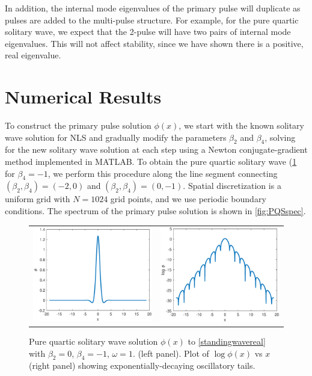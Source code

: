 \documentclass[12pt]{article}
\begin{document}
In addition, the internal mode eigenvalues of the primary pulse will duplicate as pulses are added to the multi-pulse structure. For example, for the pure quartic solitary wave, we expect that the 2-pulse will have two pairs of internal mode eigenvalues. This will not affect stability, since we have shown there is a positive, real eigenvalue.

\section{Numerical Results}

To construct the primary pulse solution $\phi(x)$, we start with the known solitary wave solution for NLS and gradually modify the parameters $\beta_2$ and $\beta_4$, solving for the new solitary wave solution at each step using a Newton conjugate-gradient method \cite[Chapter 7.2.4]{YangCh7} implemented in MATLAB. To obtain the pure quartic solitary wave (\cref{fig:PQS} for $\beta_4 = -1$, we perform this procedure along the line segment connecting $(\beta_2, \beta_4) = (-2, 0)$ and $(\beta_2, \beta_4) = (0, -1)$. Spatial discretization is a uniform grid with $N = 1024$ grid points, and we use periodic boundary conditions. The spectrum of the primary pulse solution is shown in \cref{fig:PQSspec}.

\begin{figure}[H]
\centering
\begin{tabular}{cc}
\includegraphics[width=8cm]{images/PQS1.eps} &
\includegraphics[width=8cm]{images/PQS1log.eps}
\end{tabular}
\caption{Pure quartic solitary wave solution $\phi(x)$ to \cref{standingwavereal} with $\beta_2 = 0$, $\beta_4 = -1$, $\omega = 1$. (left panel). Plot of $\log \phi(x)$ vs $x$ (right panel) showing exponentially-decaying oscillatory tails. }
\label{fig:PQS}
\end{figure} 
\end{document}
